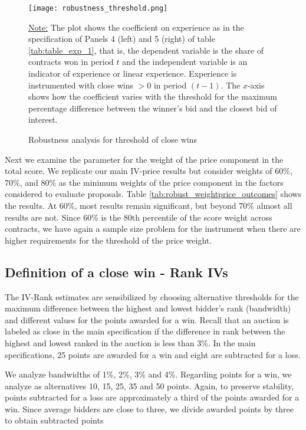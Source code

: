  \begin{figure}[H]
         \centering
         \texttt{[image: robustness\_threshold.png]}
         \caption{Robustness analysis for threshold of close wins}
         \label{fig:close_wins_robust}

  \vskip 0.5mm
  {\noindent \justifying\footnotesize\underline {Note:} The plot shows the coefficient on experience as in the specification of Panels 4 (left) and 5 (right) of table \ref{tab:table_exp_1}, that is, the dependent variable is the share of contracts won in period $t$ and the independent variable is an indicator of experience or linear experience. Experience is instrumented with close wins $> 0$ in period $(t-1)$. The $x$-axis shows how the coefficient varies with the threshold for the maximum percentage difference between the winner's bid and the closest bid of interest.\par}
 \end{figure}

Next we examine the parameter for the weight of the price component in the total score. We replicate our main IV-price results but consider weights  of 60\%, 70\%, and 80\% as the minimum weights of the price component in the factors considered to evaluate proposals. Table \ref{tab:robust_weightprice_outcomes} shows the results. At 60\%, most results remain significant, but beyond 70\% almost all results are not. Since 60\% is the 80th percentile of the score weight across contracts, we have again a sample size problem for the instrument when there are higher requirements for the threshold of the price weight.



\subsection{Definition of a close win - Rank IVs}
The IV-Rank estimates are sensibilized by choosing alternative thresholds for the maximum difference between the highest and lowest bidder's rank (bandwidth) and different values for the points awarded for a win. Recall that an auction is labeled as close in the main specification if the difference in rank between the highest and lowest ranked in the auction is less than 3\%. In the main specifications, 25 points are awarded for a win and eight are subtracted for a loss.

We analyze bandwidths of 1\%, 2\%, 3\% and 4\%. Regarding points for a win, we analyze as alternatives 10, 15, 25, 35 and 50 points. Again, to preserve stability, points subtracted for a loss are approximately a third of the points awarded for a win. Since average bidders are close to three, we divide awarded points by three to obtain subtracted points

